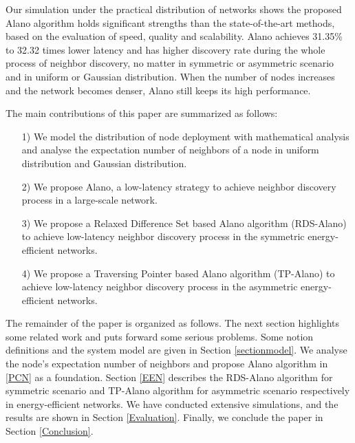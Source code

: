 Our simulation under the practical distribution of networks 
\cite{wang2013gaussian} shows the proposed Alano algorithm
holds significant strengths than the state-of-the-art methods,
based on the evaluation of speed, quality and scalability.%
Alano achieves 31.35\% to 32.32 times lower latency
and has higher discovery rate during the whole process of neighbor discovery, 
no matter in symmetric or asymmetric scenario and in uniform or Gaussian distribution.
When the number of nodes increases and the network becomes denser, 
Alano still keeps its high performance. 


The main contributions of this paper are summarized as follows:
\begin{itemize}
\item[1)] We model the distribution of node deployment with mathematical analysis 
and analyse the expectation number of neighbors of a node in uniform distribution and Gaussian
distribution.
\item[2)] We propose Alano, a low-latency strategy to achieve neighbor discovery process
in a large-scale network.
\item[3)] We propose a Relaxed Difference Set based Alano algorithm (RDS-Alano) 
to achieve low-latency neighbor discovery process in the symmetric energy-efficient networks. 
\item[4)] We propose a Traversing Pointer based Alano algorithm (TP-Alano) to
achieve low-latency neighbor discovery process in the asymmetric energy-efficient networks. 
\end{itemize}


The remainder of the paper is organized as follows.
The next section highlights some related work and 
puts forward some serious problems. 
Some notion definitions and the system model are given in Section \ref{sectionmodel}. 
We analyse the node's expectation number of neighbors and 
propose Alano algorithm in \ref{PCN} as a foundation.
Section \ref{EEN} describes the RDS-Alano algorithm for 
symmetric scenario and TP-Alano algorithm for asymmetric scenario
respectively in energy-efficient networks.
We have conducted extensive simulations, and the results are shown in Section
\ref{Evaluation}. Finally, we conclude the paper in Section
\ref{Conclusion}.

